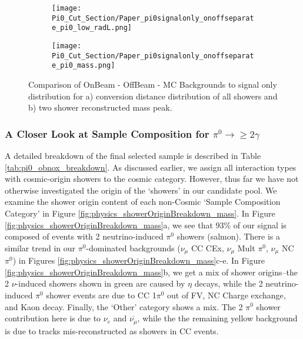\begin{figure}[h!]
\centering
  \begin{subfigure}[t]{0.3\textwidth}
    \centering
\texttt{[image: Pi0\_Cut\_Section/Paper\_pi0signalonly\_onoffseparate\_pi0\_low\_radL.png]}
  \caption{ }
  \end{subfigure} 
  \hspace{30mm}
  \begin{subfigure}[t]{0.3\textwidth}
    \centering
\texttt{[image: Pi0\_Cut\_Section/Paper\_pi0signalonly\_onoffseparate\_pi0\_mass.png]}
  \caption{ }
  \end{subfigure} 

\caption{ Comparison of OnBeam - OffBeam - MC Backgrounds to signal only distribution for a) conversion distance distribution of all showers and b) two shower reconstructed mass peak.  }
\label{fig:physics_pi0signalonly_mass} 
\end{figure}


\clearpage
\subsubsection{A Closer Look at Sample Composition for $\pi^0\rightarrow\geq 2 \gamma$}
A detailed breakdown of the final selected sample is described in Table \ref{tab:pi0_obnox_breakdown}.  As discussed earlier, we assign all interaction types with cosmic-origin showers to the cosmic category.  However, thus far we have not otherwise investigated the origin of the `showers' in our candidate pool.  We examine the shower origin content of each non-Cosmic `Sample Composition Category' in Figure \ref{fig:physics_showerOriginBreakdown_mass}.  In Figure \ref{fig:physics_showerOriginBreakdown_mass}a, we see that 93\% of our signal is composed of events with 2 neutrino-induced $\pi^0$ showers (salmon). There is a similar trend in our $\pi^0$-dominated backgrounds ($\nu_\mu$ CC CEx, $\nu_\mu$ Mult $\pi^0$, $\nu_\mu$ NC $\pi^0$) in Figures \ref{fig:physics_showerOriginBreakdown_mass}c-e.  In Figure \ref{fig:physics_showerOriginBreakdown_mass}b, we get a mix of shower origins--the 2 $\nu$-induced showers shown in green are caused by $\eta$ decays, while the 2 neutrino-induced $\pi^0$ shower events are due to CC 1$\pi^0$ out of FV, NC Charge exchange, and Kaon decay. Finally, the `Other' category shows a mix.  The 2 $\pi^0$ shower contribution here is due to $\nu_e$ and $\overline{\nu_\mu}$, while the the remaining yellow background is due to tracks mis-reconstructed as showers in CC events.

